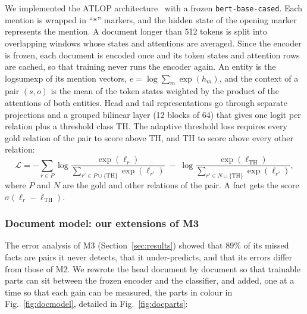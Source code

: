 \documentclass[pdflatex,sn-mathphys-num]{sn-jnl}
\begin{document}
We implemented the ATLOP architecture~\cite{zhou2021atlop} with a frozen \texttt{bert-base-cased}. Each mention is wrapped in ``\texttt{*}'' markers, and the hidden state of the opening marker represents the mention. A document longer than 512 tokens is split into overlapping windows whose states and attentions are averaged. Since the encoder is frozen, each document is encoded once and its token states and attention rows are cached, so that training never runs the encoder again. An entity is the logsumexp of its mention vectors, $e = \log\sum_{m} \exp(h_m)$, and the context of a pair $(s,o)$ is the mean of the token states weighted by the product of the attentions of both entities. Head and tail representations go through separate projections and a grouped bilinear layer (12 blocks of 64) that gives one logit per relation plus a threshold class TH. The adaptive threshold loss requires every gold relation of the pair to score above TH, and TH to score above every other relation:
\begin{equation}
\mathcal{L} = -\sum_{r \in P} \log \frac{\exp(\ell_r)}{\sum_{r' \in P \cup \{\mathrm{TH}\}} \exp(\ell_{r'})} \; - \; \log \frac{\exp(\ell_{\mathrm{TH}})}{\sum_{r' \in N \cup \{\mathrm{TH}\}} \exp(\ell_{r'})},
\end{equation}
where $P$ and $N$ are the gold and other relations of the pair. A fact gets the score $\sigma(\ell_r - \ell_{\mathrm{TH}})$.

\subsubsection{Document model: our extensions of M3}\label{sec:docmodel}

The error analysis of M3 (Section~\ref{sec:results}) showed that 89\% of its missed facts are pairs it never detects, that it under-predicts, and that its errors differ from those of M2. We rewrote the head document by document so that trainable parts can sit between the frozen encoder and the classifier, and added, one at a time so that each gain can be measured, the parts in colour in Fig.~\ref{fig:docmodel}, detailed in Fig.~\ref{fig:docparts}:
\end{document}
